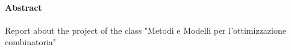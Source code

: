 \paragraph{Abstract} Report about the project of the class "Metodi e Modelli per l'ottimizzazione combinatoria"
